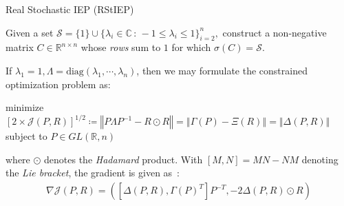 \documentclass{beamer}
\begin{document}
\beamertemplatenavigationsymbolsempty

\begin{frame}


  \begin{titled-frame}{Real Stochastic IEP (RStIEP)}

    \centering

    Given a set $\mathcal{S} = \{1\} \cup \{ \lambda_i \in \mathbb{C} \,:\, -1 \leq \lambda_i \leq 1 \}_{i = 2}^n,$ construct a non-negative matrix $C \in \mathbb{R}^{n \times n}$ whose \emph{rows} sum to $1$ for which $\sigma(C) = \mathcal{S}$.

  \end{titled-frame}

  If $\lambda_1 = 1, \Lambda = \text{diag}{(\lambda_1, \cdots, \lambda_n)}$, then we may formulate the constrained optimization problem as:

  \begin{center}
    minimize\\$\left[ 2 \times \mathcal{J}(P,R) \right]^{1/2} \coloneqq \left\Vert P \Lambda P^{-1} - R \odot R \right\Vert = \left\Vert \Gamma(P) - \Xi(R) \right\Vert = \Vert \Delta(P,R) \Vert$\\subject to $P \in GL(\mathbb{R},n) $
  \end{center}
  where $\odot$ denotes the \emph{Hadamard} product.
  With $[M, N] = MN - NM$ denoting the \emph{Lie bracket}, the gradient is given as~\autocite{chuInverseEigenvalueProblems2005}:
  \begin{align*}
    \nabla \mathcal{J}(P,R) = \left( \left[ \Delta(P,R), \Gamma(P)^T \right] P^{-T}, -2 \Delta(P,R) \odot R \right)
  \end{align*}

\end{frame}
\end{document}
